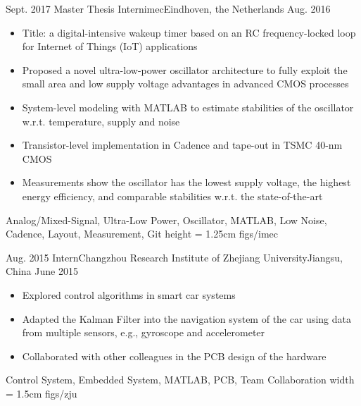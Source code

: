 %
%
%
%
%

\begin{experiences}
	\experience
    {Sept. 2017}	{Master Thesis Intern}{imec}{Eindhoven, the Netherlands}
    {Aug. 2016}	{
    				\begin{itemize}
              \item Title: a digital-intensive wakeup timer based on an RC frequency-locked loop for Internet of Things (IoT) applications
    					\item Proposed a novel ultra-low-power oscillator architecture to fully exploit the small area and low supply voltage advantages in advanced CMOS processes
              \item System-level modeling with MATLAB to estimate stabilities of the oscillator w.r.t. temperature, supply and noise
              \item Transistor-level implementation in Cadence and tape-out in TSMC 40-nm CMOS
              \item Measurements show the oscillator has the lowest supply voltage, the highest energy efficiency, and comparable stabilities w.r.t. the state-of-the-art
    				\end{itemize}
    			}
                {Analog/Mixed-Signal, Ultra-Low Power, Oscillator, MATLAB, Low Noise, Cadence, Layout, Measurement, Git}
     {height = 1.25cm}		{figs/imec}
	\emptySeparator

    \experience
    {Aug. 2015}	{Intern}{Changzhou Research Institute of Zhejiang University}{Jiangsu, China}
    {June 2015}{
    				\begin{itemize}
              \item Explored control algorithms in smart car systems
    					\item Adapted the Kalman Filter into the navigation system of the car using data from multiple sensors, e.g., gyroscope and accelerometer
              \item Collaborated with other colleagues in the PCB design of the hardware
    				\end{itemize}
    			}
                {Control System, Embedded System, MATLAB, PCB, Team Collaboration}
     {width = 1.5cm}		{figs/zju}

\end{experiences}
